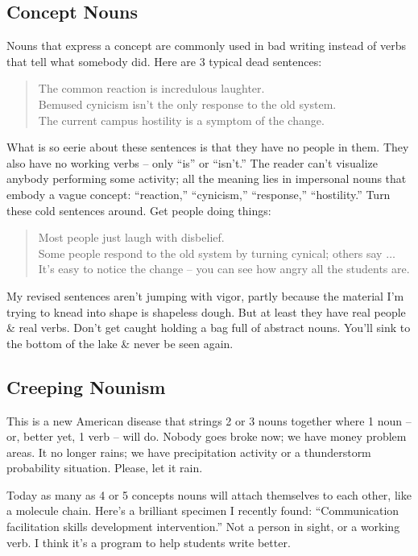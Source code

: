 \documentclass{article}
\begin{document}
\subsection{Concept Nouns}
Nouns that express a concept are commonly used in bad writing instead of verbs that tell what somebody did. Here are 3 typical dead sentences:
\begin{quote}
	The common reaction is incredulous laughter.\\Bemused cynicism isn't the only response to the old system.\\The current campus hostility is a symptom of the change.
\end{quote}
What is so eerie about these sentences is that they have no people in them. They also have no working verbs -- only ``is'' or ``isn't.'' The reader can't visualize anybody performing some activity; all the meaning lies in impersonal nouns that embody a vague concept: ``reaction,'' ``cynicism,'' ``response,'' ``hostility.'' Turn these cold sentences around. Get people doing things:
\begin{quote}
	Most people just laugh with disbelief.\\Some people respond to the old system by turning cynical; others say $\ldots$\\It's easy to notice the change -- you can see how angry all the students are.
\end{quote}
My revised sentences aren't jumping with vigor, partly because the material I'm trying to knead into shape is shapeless dough. But at least they have real people \& real verbs. Don't get caught holding a bag full of abstract nouns. You'll sink to the bottom of the lake \& never be seen again.

\subsection{Creeping Nounism}
This is a new American disease that strings 2 or 3 nouns together where 1 noun -- or, better yet, 1 verb -- will do. Nobody goes broke now; we have money problem areas. It no longer rains; we have precipitation activity or a thunderstorm probability situation. Please, let it rain.

Today as many as 4 or 5 concepts nouns will attach themselves to each other, like a molecule chain. Here's a brilliant specimen I recently found: ``Communication facilitation skills development intervention.'' Not a person in sight, or a working verb. I think it's a program to help students write better.
\end{document}
